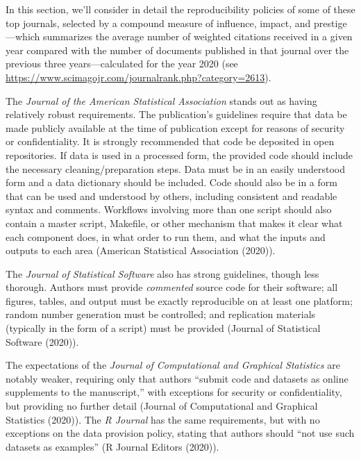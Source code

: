 \documentclass[12pt,twoside]{reedthesis}
\begin{document}
In this section, we'll consider in detail the reproducibility policies of some of these top journals, selected by a compound measure of influence, impact, and prestige---which summarizes the average number of weighted citations received in a given year compared with the number of documents published in that journal over the previous three years---calculated for the year 2020 (see \url{https://www.scimagojr.com/journalrank.php?category=2613}).

The \emph{Journal of the American Statistical Association} stands out as having relatively robust requirements. The publication's guidelines require that data be made publicly available at the time of publication except for reasons of security or confidentiality. It is strongly recommended that code be deposited in open repositories. If data is used in a processed form, the provided code should include the necessary cleaning/preparation steps. Data must be in an easily understood form and a data dictionary should be included. Code should also be in a form that can be used and understood by others, including consistent and readable syntax and comments. Workflows involving more than one script should also contain a master script, Makefile, or other mechanism that makes it clear what each component does, in what order to run them, and what the inputs and outputs to each area (American Statistical Association (2020)).

The \emph{Journal of Statistical Software} also has strong guidelines, though less thorough. Authors must provide \emph{commented} source code for their software; all figures, tables, and output must be exactly reproducible on at least one platform; random number generation must be controlled; and replication materials (typically in the form of a script) must be provided (Journal of Statistical Software (2020)).

The expectations of the \emph{Journal of Computational and Graphical Statistics} are notably weaker, requiring only that authors ``submit code and datasets as online supplements to the manuscript,'' with exceptions for security or confidentiality, but providing no further detail (Journal of Computational and Graphical Statistics (2020)). The \emph{R Journal} has the same requirements, but with no exceptions on the data provision policy, stating that authors should ``not use such datasets as examples'' (R Journal Editors (2020)).
\end{document}
